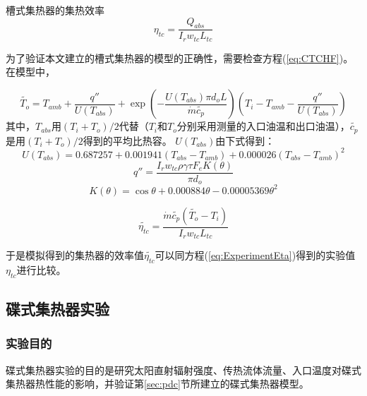 槽式集热器的集热效率
\begin{equation}
	\eta_{tc} = \dfrac{Q_{abs}}{I_rw_{tc}L_{tc}}
	\label{eq:ExperimentEta}
\end{equation}

为了验证本文建立的槽式集热器的模型的正确性，需要检查方程(\ref{eq:CTCHF})。在模型中，

\begin{equation}
	\widetilde{T_{o}}=T_{amb} + \dfrac{q''}{U(T_{abs})} + \exp(-\frac{U(T_{abs})\pi d_o L}{\dot{m}\widetilde{c_p}})(T_{i}-T_{amb}-\dfrac{q''}{U(T_{abs})})
	\label{eq:CheckT_o}
\end{equation}
其中，$T_{abs}$用$(T_i + T_o)/2$代替（$T_i$和$T_o$分别采用测量的入口油温和出口油温），$\widetilde{c_p}$是用$(T_i + T_o)/2$得到的平均比热容。
$U(T_{abs})$由下式得到\cite{Romero2007}：
\begin{equation}
	U(T_{abs}) = 0.687257 + 0.001941(T_{abs} - T_{amb}) + 0.000026(T_{abs} - T_{amb})^2
	\label{eq:U_T_abs}
\end{equation}
\begin{equation}
	q'' = \frac{I_r w_{tc} \rho \gamma \tau F_e K(\theta)}{\pi d_o}
\end{equation}
\begin{equation}
	K(\theta) = \cos\theta+0.000884\theta-0.00005369\theta^2
\end{equation}

\begin{equation}
	\widetilde{\eta_{tc}} = \dfrac{\dot{m}\widetilde{c_p}(\widetilde{T_o}-T_i)}{I_rw_{tc}L_{tc}}
\end{equation}

于是模拟得到的集热器的效率值$\widetilde{\eta_{tc}}$可以同方程(\ref{eq:ExperimentEta})得到的实验值$\eta_{tc}$进行比较。

	
\subsection{碟式集热器实验}
\subsubsection{实验目的}
碟式集热器实验的目的是研究太阳直射辐射强度、传热流体流量、入口温度对碟式集热器热性能的影响，并验证第\ref{sec:pdc}节所建立的碟式集热器模型。

